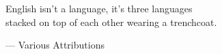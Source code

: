 \begin{flushright}
\begin{hangleftquote}{\QENOpen}{\QENClose}
English isn't a language, it's three languages\\
stacked on top of each other wearing a trenchcoat.
\end{hangleftquote}
\par\smallskip
\normalfont — Various Attributions
\end{flushright}
